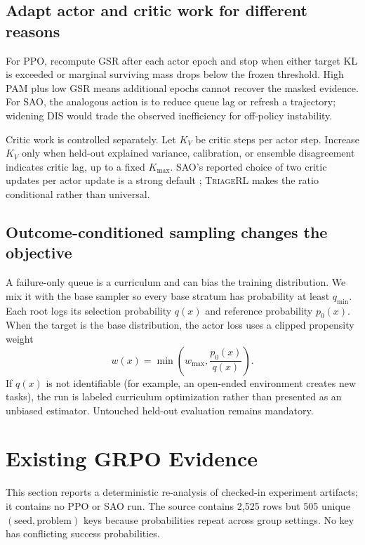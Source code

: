 \documentclass{article}
\newcommand{\method}{\textsc{TriageRL}\xspace}
\begin{document}
\subsection{Adapt actor and critic work for different reasons}

For PPO, recompute GSR after each actor epoch and stop when either target KL is
exceeded or marginal surviving mass drops below the frozen threshold.  High
PAM plus low GSR means additional epochs cannot recover the masked evidence.
For SAO, the analogous action is to reduce queue lag or refresh a trajectory;
widening DIS would trade the observed inefficiency for off-policy instability.

Critic work is controlled separately.  Let $K_V$ be critic steps per actor
step.  Increase $K_V$ only when held-out explained variance, calibration, or
ensemble disagreement indicates critic lag, up to a fixed $K_{\max}$.  SAO's
reported choice of two critic updates per actor update is a strong default
\citep{hou2026sao}; \method makes the ratio conditional rather than universal.

\subsection{Outcome-conditioned sampling changes the objective}

A failure-only queue is a curriculum and can bias the training distribution.
We mix it with the base sampler so every base stratum has probability at least
$q_{\min}$.  Each root logs its selection probability $q(x)$ and reference
probability $p_0(x)$.  When the target is the base distribution, the actor loss
uses a clipped propensity weight
\begin{equation}
  w(x)=\min\!\left(w_{\max},\frac{p_0(x)}{q(x)}\right).
  \label{eq:propensity}
\end{equation}
If $q(x)$ is not identifiable (for example, an open-ended environment creates
new tasks), the run is labeled curriculum optimization rather than presented
as an unbiased estimator.  Untouched held-out evaluation remains mandatory.

\section{Existing GRPO Evidence}
\label{sec:evidence}

This section reports a deterministic re-analysis of checked-in experiment
artifacts; it contains no PPO or SAO run.  The source contains 2,525 rows but
505 unique $(\text{seed},\text{problem})$ keys because probabilities repeat
across group settings.  No key has conflicting success probabilities.
\end{document}
